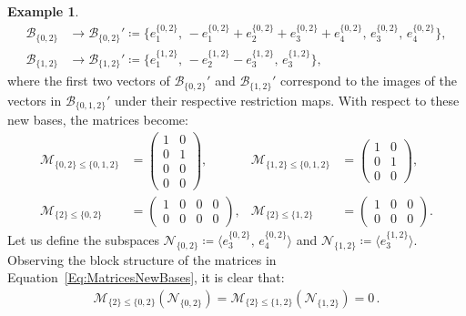 \documentclass[reqno,12pt]{amsart}
\newcommand{\cM}{\mathcal{M}}
\newcommand{\cN}{\mathcal{N}}
\newcommand{\0}{\mathbf 0}
\theoremstyle{definition}
\newtheorem{example}[theorem]{Example}
\begin{document}
\begin{example}
    \begin{align*}
        \mathcal{B}_{\{0,2\}}& \longrightarrow \mathcal{B}_{\{0,2\}}'\coloneqq \{e_{1}^{\{0,2\}},\,-e_1^{\{0,2\}}+e_{2}^{\{0,2\}}+e_{3}^{\{0,2\}}+e_4^{\{0,2\}},\, e_3^{\{0,2\}},\,e_4^{\{0,2\}}\},\\[1.5ex]
        \mathcal{B}_{\{1,2\}}& \longrightarrow \mathcal{B}_{\{1,2\}}'\coloneqq \{e_1^{\{1,2\}},\,-e_2^{\{1,2\}}-e_3^{\{1,2\}}, \,e_3^{\{1,2\}}\},
    \end{align*}
    where the first two vectors of $\mathcal{B}_{\{0,2\}}'$ and $\mathcal{B}_{\{1,2\}}'$ correspond to the images of the vectors in $\mathcal{B}_{\{0,1,2\}}'$ under their respective restriction maps. With respect to these new bases, the matrices become: 
    \begin{equation}
        \label{Eq:MatricesNewBases}
        \begin{aligned}
            \cM_{\{0,2\} \leq\{0,1,2\}} &= \begin{pmatrix} 
                1 & 0 \\ 0 & 1 \\ 0 & 0 \\ 0 & 0 
            \end{pmatrix}, &
            \cM_{\{1,2\} \leq \{0,1,2\}} &= \begin{pmatrix} 
                1 & 0 \\ 0 & 1 \\ 0 & 0 
            \end{pmatrix}, \\[2ex]
            \cM_{\{2\} \leq \{0,2\}} &= \begin{pmatrix} 
                1 & 0 & 0 & 0 \\ 0 & 0 & 0 & 0 
            \end{pmatrix}, & 
            \cM_{\{2\} \leq \{1,2\}} &= \begin{pmatrix} 
                1 & 0 & 0 \\ 0 & 0 & 0 
            \end{pmatrix}.
        \end{aligned}
    \end{equation}
    Let us define the subspaces $\cN_{\{0,2\}}\coloneqq \langle e_3^{\{0,2\}}, \,e_4^{\{0,2\}}\rangle$ and $\cN_{\{1,2\}}\coloneqq \langle e_3^{\{1,2\}}\rangle$. Observing the block structure of the matrices in Equation~\eqref{Eq:MatricesNewBases}, it is clear that:
    \begin{align}\label{Eq:TrivialMaps}
        \cM_{\{2\}\leq \{0,2\}}(\cN_{\{0,2\}})=\cM_{\{2\}\leq \{1,2\}}(\cN_{\{1,2\}})=0\,.

\end{align}
\end{example}
\end{document}
